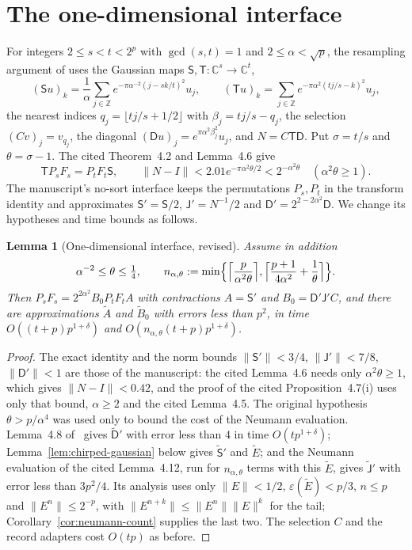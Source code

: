 \documentclass[11pt]{article}
\newtheorem{lemma}{Lemma}
\begin{document}
\section{The one-dimensional interface}
For integers $2\le s<t<2^p$ with $\gcd(s,t)=1$ and $2\le\alpha<\sqrt p$, the
resampling argument of \cite[Section~4]{HarveyHoeven2021} uses the Gaussian
maps $\mathsf S,\mathsf T:\mathbb C^s\to\mathbb C^t$,
\[
 (\mathsf Su)_k=\frac1\alpha\sum_{j\in\mathbb Z}e^{-\pi\alpha^{-2}(j-sk/t)^2}u_j,
 \qquad
 (\mathsf Tu)_k=\sum_{j\in\mathbb Z}e^{-\pi\alpha^2(tj/s-k)^2}u_j,
\]
the nearest indices $q_j=\lfloor tj/s+1/2\rfloor$ with $\beta_j=tj/s-q_j$, the
selection $(Cv)_j=v_{q_j}$, the diagonal $(\mathsf Du)_j=e^{\pi\alpha^2\beta_j^2}u_j$,
and $N=C\mathsf T\mathsf D$. Put $\sigma=t/s$ and $\theta=\sigma-1$. The cited
Theorem~4.2 and Lemma~4.6 give
\begin{equation}\label{eq:gaussian-public-facts}
 \mathsf TP_sF_s=P_tF_t\mathsf S,\qquad
 \|N-I\|<2.01e^{-\pi\alpha^2\theta/2}<2^{-\alpha^2\theta}
 \quad(\alpha^2\theta\ge1).
\end{equation}
The manuscript's no-sort interface keeps the permutations $P_s,P_t$ in the
transform identity and approximates $\mathsf S'=\mathsf S/2$,
$\mathsf J'=N^{-1}/2$ and $\mathsf D'=2^{2-2\alpha^2}\mathsf D$. We change its
hypotheses and time bounds as follows.

\begin{lemma}[One-dimensional interface, revised]
\label{lem:no-sort-resampling}
Assume in addition
\[
 \alpha^{-2}\le\theta\le\tfrac14,\qquad
 n_{\alpha,\theta}:=\min\Bigl\{\Bigl\lceil\frac p{\alpha^2\theta}\Bigr\rceil,
   \Bigl\lceil\frac{p+1}{4\alpha^2}+\frac1\theta\Bigr\rceil\Bigr\}.
\]
Then $P_sF_s=2^{2\alpha^2}B_0P_tF_tA$ with contractions $A=\mathsf S'$ and
$B_0=\mathsf D'\mathsf J'C$, and there are approximations $\widetilde A$ and
$\widetilde B_0$ with errors less than $p^2$, in time
$O((t+p)p^{1+\delta})$ and $O(n_{\alpha,\theta}(t+p)p^{1+\delta})$.
\end{lemma}

\begin{proof}
The exact identity and the norm bounds $\|\mathsf S'\|<3/4$,
$\|\mathsf J'\|<7/8$, $\|\mathsf D'\|<1$ are those of the manuscript: the cited
Lemma~4.6 needs only $\alpha^2\theta\ge1$, which gives $\|N-I\|<0.42$, and
the proof of the cited Proposition~4.7(i) uses only that bound, $\alpha\ge2$ and the cited
Lemma~4.5. The original hypothesis $\theta>p/\alpha^4$ was used only to bound
the cost of the Neumann evaluation. Lemma~4.8 of~\cite{HarveyHoeven2021} gives
$\widetilde{\mathsf D}'$ with error less than $4$ in time $O(tp^{1+\delta})$;
Lemma~\ref{lem:chirped-gaussian} below gives $\widetilde{\mathsf S}'$ and
$\widetilde E$; and the Neumann evaluation of the cited Lemma~4.12, run for
$n_{\alpha,\theta}$ terms with this $\widetilde E$, gives
$\widetilde{\mathsf J}'$ with error less than $3p^2/4$. Its analysis uses only
$\|E\|<1/2$, $\varepsilon(\widetilde E)<p/3$, $n\le p$ and $\|E^n\|\le2^{-p}$,
with $\|E^{n+k}\|\le\|E^n\|\|E\|^k$ for the tail;
Corollary~\ref{cor:neumann-count} supplies the last two. The selection $C$ and
the record adapters cost $O(tp)$ as before.
\end{proof}
\end{document}
